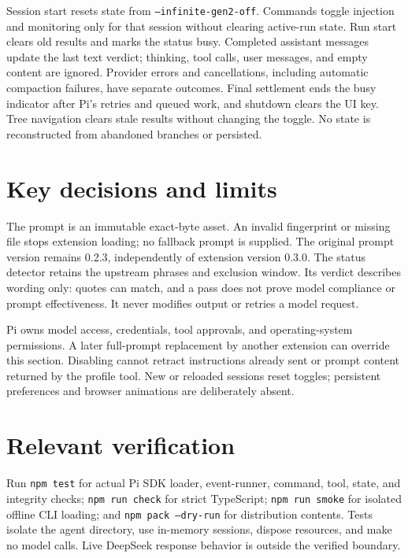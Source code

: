 \documentclass[10pt]{ltjsarticle}
\begin{document}
Session start resets state from \texttt{--infinite-gen2-off}. Commands toggle
injection and monitoring only for that session without clearing active-run state. Run start clears old results
and marks the status busy. Completed assistant messages update the last text
verdict; thinking, tool calls, user messages, and empty content are ignored.
Provider errors and cancellations, including automatic compaction failures,
have separate outcomes. Final settlement
ends the busy indicator after Pi's retries and queued work, and shutdown
clears the UI key. Tree navigation clears stale results without changing the
toggle. No state is reconstructed from abandoned branches or persisted.

\section{Key decisions and limits}
The prompt is an immutable exact-byte asset. An invalid fingerprint or missing
file stops extension loading; no fallback prompt is supplied. The original
prompt version remains 0.2.3, independently of extension version 0.3.0.
The status detector retains the upstream phrases and exclusion window. Its
verdict describes wording only: quotes can match, and a pass does not prove
model compliance or prompt effectiveness. It never modifies output or retries
a model request.

Pi owns model access, credentials, tool approvals, and operating-system
permissions. A later full-prompt replacement by another extension can override
this section. Disabling cannot retract instructions already sent or prompt
content returned by the profile tool. New or reloaded sessions reset toggles;
persistent preferences and browser animations are deliberately absent.

\section{Relevant verification}
Run \texttt{npm test} for actual Pi SDK loader, event-runner, command, tool,
state, and integrity checks; \texttt{npm run check} for strict TypeScript;
\texttt{npm run smoke} for isolated offline CLI loading; and
\texttt{npm pack --dry-run} for distribution contents. Tests isolate the agent
directory, use in-memory sessions, dispose resources, and make no model calls.
Live DeepSeek response behavior is outside the verified boundary.
\end{document}
